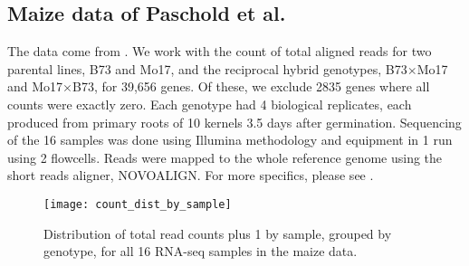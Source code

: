 \subsection{Maize data of Paschold et al.}
\label{intro-paschold}
The data come from \cite{paschold}. We work with the count of total aligned reads for two parental lines, B73 and Mo17, and the reciprocal hybrid genotypes, B73$\times$Mo17 and Mo17$\times$B73, for 39,656 genes. Of these, we exclude 2835 genes where all counts were exactly zero. Each genotype had 4 biological replicates, each produced from primary roots of 10 kernels 3.5 days after germination. Sequencing of the 16 samples was done using Illumina methodology and equipment in 1 run using 2 flowcells. Reads were mapped to the whole reference genome using the short reads aligner, NOVOALIGN. For more specifics, please see \cite{paschold}.


\begin{figure}
\centering
\begin{minipage}{.8\textwidth}
\texttt{[image: count\_dist\_by\_sample]}
\caption{Distribution of total read counts plus 1 by sample, grouped by genotype, for all 16 RNA-seq samples in the maize data.}
\label{fig:count-dist}
\end{minipage}
\end{figure}

